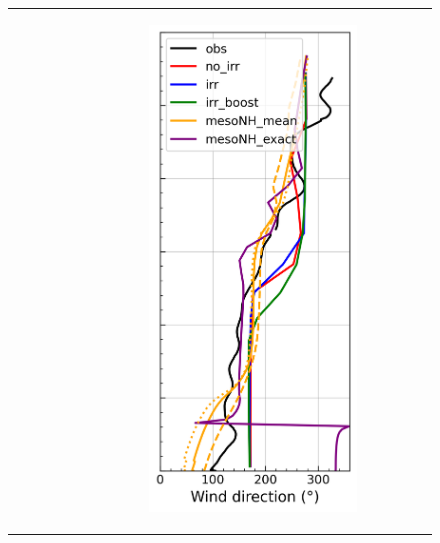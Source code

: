 \begin{figure}[hbtp]
{\begin{tabular}{@{}cccc@{}}
\begin{subfigure}[t]{0.283\textwidth}
        \end{subfigure} &
        \begin{subfigure}[t]{0.283\textwidth}
            \caption{}
            \includegraphics[width=\textwidth]{images/chap6/profiles/profile_cendrosa_wind_direction_2007_sensbins.png}

\end{subfigure}
\end{tabular}}
\end{figure}
